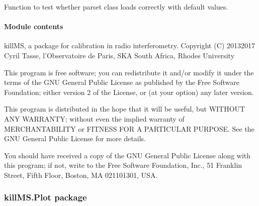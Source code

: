 \documentclass[letterpaper,10pt,english]{sphinxmanual}
\begin{document}

\begin{fulllineitems}
\label{\detokenize{api/killMS.Parset:killMS.Parset.ReadCFG.test}}
\pysigstartsignatures
{}
\pysigstopsignatures
\sphinxAtStartPar
Function to test whether parset class loads correctly with default values.

\end{fulllineitems}



\paragraph{Module contents}
\label{\detokenize{api/killMS.Parset:module-killMS.Parset}}\label{\detokenize{api/killMS.Parset:module-contents}}
\sphinxAtStartPar
killMS, a package for calibration in radio interferometry.
Copyright (C) 2013\sphinxhyphen{}2017  Cyril Tasse, l’Observatoire de Paris,
SKA South Africa, Rhodes University

\sphinxAtStartPar
This program is free software; you can redistribute it and/or
modify it under the terms of the GNU General Public License
as published by the Free Software Foundation; either version 2
of the License, or (at your option) any later version.

\sphinxAtStartPar
This program is distributed in the hope that it will be useful,
but WITHOUT ANY WARRANTY; without even the implied warranty of
MERCHANTABILITY or FITNESS FOR A PARTICULAR PURPOSE.  See the
GNU General Public License for more details.

\sphinxAtStartPar
You should have received a copy of the GNU General Public License
along with this program; if not, write to the Free Software
Foundation, Inc., 51 Franklin Street, Fifth Floor, Boston, MA  02110\sphinxhyphen{}1301, USA.

\sphinxstepscope


\subsubsection{killMS.Plot package}
\label{\detokenize{api/killMS.Plot:killms-plot-package}}\label{\detokenize{api/killMS.Plot::doc}}
\end{document}
